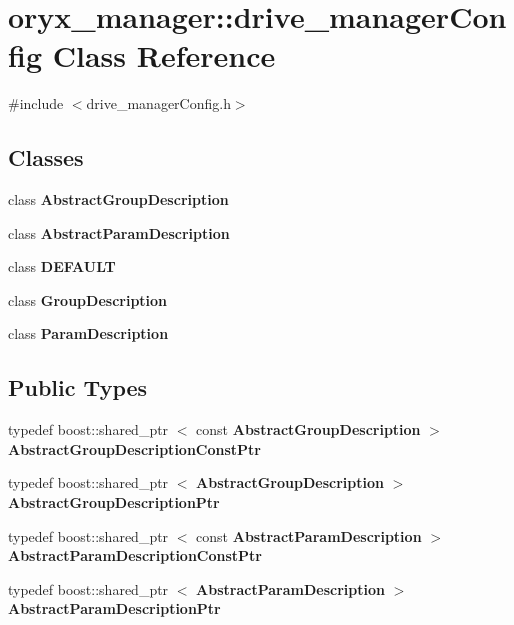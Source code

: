 \section{oryx\-\_\-manager\-:\-:drive\-\_\-manager\-Config \-Class \-Reference}
\label{classoryx__manager_1_1drive__managerConfig}


{\ttfamily \#include $<$drive\-\_\-manager\-Config.\-h$>$}

\subsection*{\-Classes}
\begin{DoxyCompactItemize}
\item 
class {\bf \-Abstract\-Group\-Description}
\item 
class {\bf \-Abstract\-Param\-Description}
\item 
class {\bf \-D\-E\-F\-A\-U\-L\-T}
\item 
class {\bf \-Group\-Description}
\item 
class {\bf \-Param\-Description}
\end{DoxyCompactItemize}
\subsection*{\-Public \-Types}
\begin{DoxyCompactItemize}
\item 
typedef boost\-::shared\-\_\-ptr\*
$<$ const \*
{\bf \-Abstract\-Group\-Description} $>$ {\bf \-Abstract\-Group\-Description\-Const\-Ptr}
\item 
typedef boost\-::shared\-\_\-ptr\*
$<$ {\bf \-Abstract\-Group\-Description} $>$ {\bf \-Abstract\-Group\-Description\-Ptr}
\item 
typedef boost\-::shared\-\_\-ptr\*
$<$ const \*
{\bf \-Abstract\-Param\-Description} $>$ {\bf \-Abstract\-Param\-Description\-Const\-Ptr}
\item 
typedef boost\-::shared\-\_\-ptr\*
$<$ {\bf \-Abstract\-Param\-Description} $>$ {\bf \-Abstract\-Param\-Description\-Ptr}
\end{DoxyCompactItemize}
